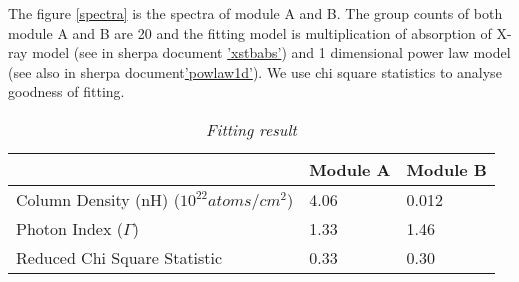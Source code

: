 \documentclass[12pt]{report}
\newcommand{\mycaption}[1]{\caption{\textit{\footnotesize #1}}}
\begin{document}
        \indent 
        The figure \ref{spectra} is the spectra of module A and B. The group counts of both module A and B are
        20 and the fitting model is multiplication of absorption of X-ray model (see in sherpa document 
        \href{http://%
        cxc.harvard.edu/sherpa/ahelp/xstbabs.html}{'xstbabs'}) and 1 dimensional power law model (see also in sherpa 
        document\href{http://cxc.harvard.edu/sherpa/ahelp/powlaw1d.html}{'powlaw1d'}). We use chi square statistics
        to analyse goodness of fitting.\\


        \begin{table}[!h] 
          \centering
          \begin{tabular}{| m{4cm} | m{3cm} | m{3cm} |}
            \hline
            & Module A & Module B \\
            \hline
            Column Density (nH) ($10^{22} atoms/cm^2$) & 4.06 & 0.012\\ 
            \hline
            Photon Index ($\Gamma$) & 1.33 & 1.46 \\
            \hline 
            Reduced Chi Square Statistic & 0.33 & 0.30 \\
            \hline 
          \end{tabular}
          \mycaption{Fitting result  }
          \label{table:parameter_1}
        \end{table}
\end{document}
